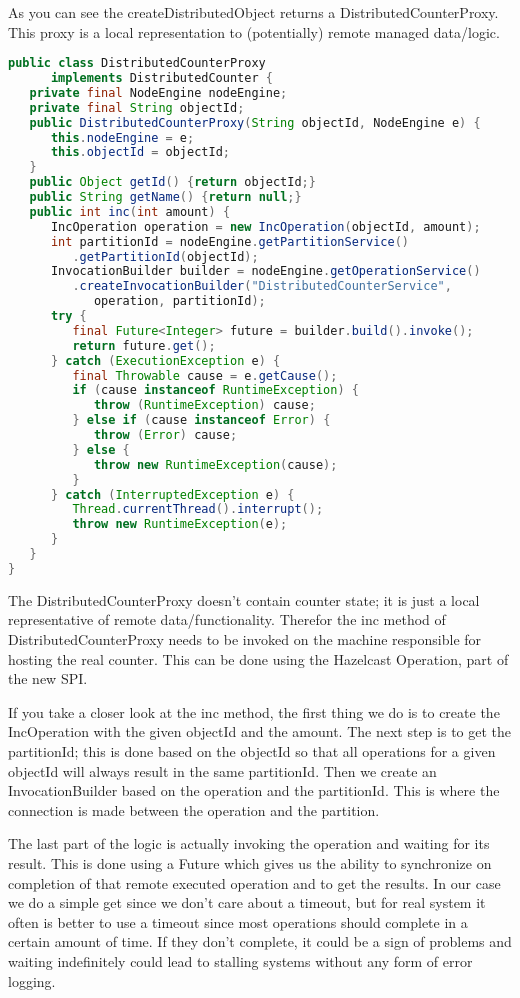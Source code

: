 As you can see the createDistributedObject returns a DistributedCounterProxy. This proxy is a local representation to (potentially) remote managed data/logic.  
\begin{lstlisting}[language=java]
public class DistributedCounterProxy 
      implements DistributedCounter {
   private final NodeEngine nodeEngine;
   private final String objectId;
   public DistributedCounterProxy(String objectId, NodeEngine e) {
      this.nodeEngine = e;
      this.objectId = objectId;
   }
   public Object getId() {return objectId;}
   public String getName() {return null;}
   public int inc(int amount) {
      IncOperation operation = new IncOperation(objectId, amount);   
      int partitionId = nodeEngine.getPartitionService()
         .getPartitionId(objectId);
      InvocationBuilder builder = nodeEngine.getOperationService()
         .createInvocationBuilder("DistributedCounterService", 
            operation, partitionId);
      try {
         final Future<Integer> future = builder.build().invoke();
         return future.get();
      } catch (ExecutionException e) {
         final Throwable cause = e.getCause();
         if (cause instanceof RuntimeException) {
            throw (RuntimeException) cause;
         } else if (cause instanceof Error) {
            throw (Error) cause;
         } else {
            throw new RuntimeException(cause);
         }
      } catch (InterruptedException e) {
         Thread.currentThread().interrupt();
         throw new RuntimeException(e);
      }
   }
}
\end{lstlisting}
The DistributedCounterProxy doesn't contain counter state; it is just a local representative of remote data/functionality. Therefor the inc method of DistributedCounterProxy needs to be invoked on the machine responsible for hosting the real counter. This can be done using the Hazelcast Operation, part of the new SPI. 

If you take a closer look at the inc method, the first thing we do is to create the IncOperation with the given objectId and the amount. The next step is to get the partitionId; this is done based on the objectId so that all operations for a given objectId will always result in the same partitionId. Then we create an InvocationBuilder based on the operation and the partitionId. This is where the connection is made between the operation and the partition. 

The last part of the logic is actually invoking the operation and waiting for its result. This is done using a Future which gives us the ability to synchronize on completion of that remote executed operation and to get the results. In our case we do a simple get since we don't care about a timeout, but for real system it often is better to use a timeout since most operations should complete in a certain amount of time. If they don't complete, it could be a sign of problems and waiting indefinitely could lead to stalling systems without any form of error logging.


